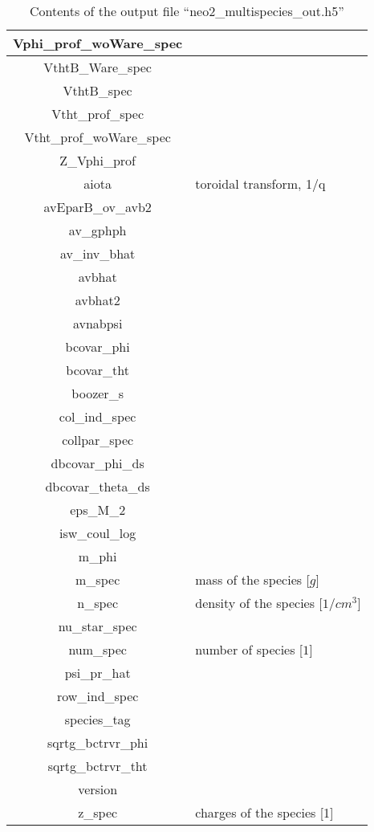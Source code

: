 \begin{table}[h]
\begin{tabular}{|c|l|}
\hline
Vphi\_prof\_woWare\_spec & \\
\hline
VthtB\_Ware\_spec & \\
\hline
VthtB\_spec & \\
\hline
Vtht\_prof\_spec & \\
\hline
Vtht\_prof\_woWare\_spec & \\
\hline
Z\_Vphi\_prof & \\
\hline
aiota & toroidal transform, 1/q \\
\hline
avEparB\_ov\_avb2 & \\
\hline
av\_gphph & \\
\hline
av\_inv\_bhat & \\
\hline
avbhat & \\
\hline
avbhat2 & \\
\hline
avnabpsi & \\
\hline
bcovar\_phi & \\
\hline
bcovar\_tht & \\
\hline
boozer\_s & \\
\hline
col\_ind\_spec & \\
\hline
collpar\_spec & \\
\hline
dbcovar\_phi\_ds & \\
\hline
dbcovar\_theta\_ds & \\
\hline
eps\_M\_2 & \\
\hline
isw\_coul\_log & \\
\hline
m\_phi & \\
\hline
m\_spec & mass of the species [$g$] \\
\hline
n\_spec & density of the species [$1/cm^3$] \\
\hline
nu\_star\_spec & \\
\hline
num\_spec & number of species [$1$] \\
\hline
psi\_pr\_hat & \\
\hline
row\_ind\_spec & \\
\hline
species\_tag & \\
\hline
sqrtg\_bctrvr\_phi & \\
\hline
sqrtg\_bctrvr\_tht & \\
\hline
version & \\
\hline
z\_spec & charges of the species [1]

\end{tabular}
\caption{Contents of the output file ``neo2\_multispecies\_out.h5''}
\end{table}


